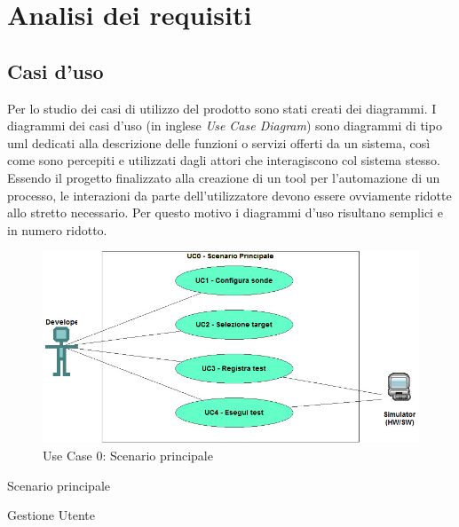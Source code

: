 \chapter{Analisi dei requisiti}
\label{chap:analisi-requisiti}

\section{Casi d'uso}
Per lo studio dei casi di utilizzo del prodotto sono stati creati dei diagrammi.
I diagrammi dei casi d'uso (in inglese \textit{Use Case Diagram}) sono diagrammi di tipo \gls{uml} dedicati alla descrizione delle funzioni o servizi offerti da un sistema, così come sono percepiti e utilizzati dagli attori che interagiscono col sistema stesso.
Essendo il progetto finalizzato alla creazione di un tool per l'automazione di un processo, le interazioni da parte dell'utilizzatore devono essere ovviamente ridotte allo stretto necessario. Per questo motivo i diagrammi d'uso risultano semplici e in numero ridotto.

\begin{figure}[ht]
    \vspace{2em}
    \centering
    \includegraphics[width=0.75\columnwidth]{img/usecase/scenario-principale.jpeg} 
    \caption{Use Case 0: Scenario principale}
    \label{fig:scenario_principale}
\end{figure}

\begin{usecase}{0}{Scenario principale}
    \label{uc:uc_scenario_principale}
\end{usecase}

\begin{usecase}{1}{Gestione Utente}
    \label{uc:uc_casi_uso}
\end{usecase}

